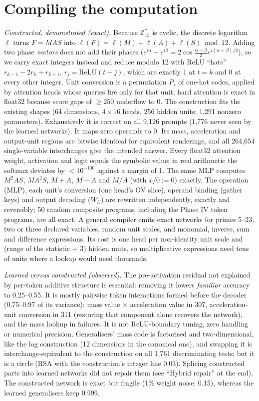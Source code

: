 \documentclass[11pt]{article}
\begin{document}
\section{Compiling the computation}\label{sec:compile}
\emph{Constructed, demonstrated (exact).} Because $\mathbb{Z}_{13}^{*}$ is cyclic, the discrete logarithm $\ell$
turns $F=M A S$ into $\ell(F)=\ell(M)+\ell(A)+\ell(S) \bmod 12$. Adding two phase \emph{vectors} does not add their
phases ($e^{i\alpha}+e^{i\beta}=2\cos\frac{\alpha-\beta}{2}e^{i(\alpha+\beta)/2}$), so we carry exact integers instead
and reduce modulo 12 with ReLU ``hats'' $r_{k-1}-2r_k+r_{k+1}$, $r_j=\mathrm{ReLU}(t-j)$, which are exactly 1 at $t=k$
and 0 at every other integer. Unit conversion is a permutation $P_s$ of one-hot codes, applied by attention heads whose
queries fire only for that unit; hard attention is exact in float32 because score gaps of $\ge250$ underflow to 0.
The construction fits the existing shapes (64 dimensions, $4\times16$ heads, 256 hidden units; 1,291 nonzero
parameters). Exhaustively it is correct on all 9,126 prompts (1,776 never seen by the learned networks). It maps zero
operands to 0. Its mass, acceleration and output-unit regions are bitwise identical for equivalent renderings, and all
264,654 single-variable interchanges give the intended answer. Every float32 attention weight, activation and logit
equals the symbolic value; in real arithmetic the softmax deviates by $<10^{-100}$ against a margin of 1. The same MLP
computes $M^2AS$, $MA^2S$, $M+A$, $M-A$ and $M/A$ (with $x/0:=0$) exactly. The operation (MLP), each unit's
conversion (one head's OV slice), operand binding (gather keys) and output decoding ($W_U$) are rewritten
independently, exactly and reversibly; 50 random composite programs, including the Phase IV token programs, are all
exact. A general compiler emits exact networks for primes 5--23, two or three declared variables, random unit scales,
and monomial, inverse, sum and difference expressions. Its cost is one head per non-identity unit scale and (range of
the statistic + 3) hidden units, so multiplicative expressions need tens of units where a lookup would need thousands.

\emph{Learned versus constructed (observed).} The pre-activation residual not explained by per-token additive structure
is essential: removing it lowers \emph{familiar} accuracy to 0.25--0.55. It is mostly pairwise token interactions
formed before the decoder (0.75--0.97 of its variance): mass value $\times$ acceleration value in 307,
acceleration-unit conversion in 311 (restoring that component alone recovers the network), and the mass lookup in
failures. It is not ReLU-boundary tuning, zero handling or numerical precision. Generalisers' mass code is factorised
and two-dimensional, like the log construction (12 dimensions in the canonical one), and swapping it is
interchange-equivalent to the construction on all 1,761 discriminating tests; but it is a circle (RSA with the
construction's integer line 0.03). Splicing constructed parts into learned networks did not repair them
(see ``Hybrid repair'' at the end). The constructed network is exact but fragile (1\% weight noise: 0.15), whereas the learned
generalisers keep 0.999.
\end{document}

